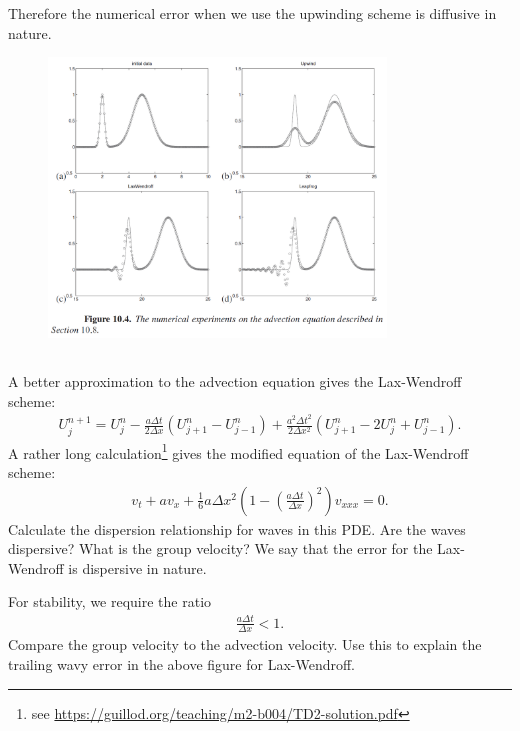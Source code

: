 \documentclass[11pt,letterpaper]{report}
\begin{document}
Therefore the numerical error when we use the upwinding scheme is diffusive in nature.

\begin{figure}[H]
    \centering
    \includegraphics[width=0.8\textwidth]{../Session_9/figs/num_dispers}
\end{figure}

\subsection{}
A better approximation to the advection equation gives the Lax-Wendroff scheme:
\begin{align}
    U^{n+1}_j = U^n_j-\frac{a\Delta t}{2\Delta x}\left( U^n_{j+1}-U^n_{j-1} \right)+\frac{a^2 \Delta t^2}{2\Delta x^2}\left(U^n_{j+1}-2U^n_{j}+U^n_{j-1}\right).
\end{align}
A rather long calculation\footnote{see \url{https://guillod.org/teaching/m2-b004/TD2-solution.pdf}} gives the modified equation of the Lax-Wendroff scheme:
\begin{align}
    v_t+av_x +\frac{1}{6}a\Delta x^2\left(1-\left(\frac{a\Delta t}{\Delta x}\right)^2\right)v_{xxx} = 0.
\end{align}
Calculate the dispersion relationship for waves in this PDE. Are the waves dispersive? What is the group velocity? We say that the error for the Lax-Wendroff is dispersive in nature. 

For stability, we require the ratio
\begin{align}
    \frac{a\Delta t}{\Delta x}<1.
\end{align}
Compare the group velocity to the advection velocity. Use this to explain the trailing wavy error in the above figure for Lax-Wendroff. 
\end{document}
